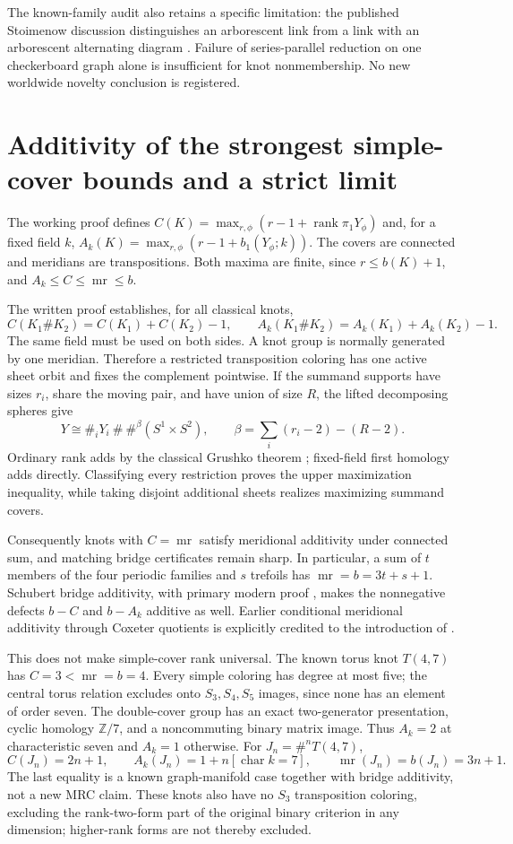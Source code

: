 \documentclass[11pt]{article}
\newcommand{\mr}{\operatorname{mr}}
\begin{document}
The known-family audit also retains a specific limitation:
the published Stoimenow discussion distinguishes an
arborescent link from a link with an arborescent alternating
diagram \cite[Proposition 6.3, Remark 6.4]{stoim}. Failure
of series-parallel reduction on one checkerboard graph
alone is insufficient for knot nonmembership. No new
worldwide novelty conclusion is registered.

\section{Additivity of the strongest simple-cover bounds and a strict limit}

The working proof 
defines $C(K)=\max_{r,\phi}(r-1+\operatorname{rank}\pi_1Y_\phi)$ and,
for a fixed field $k$, $A_k(K)=\max_{r,\phi}(r-1+b_1(Y_\phi;k))$.
The covers are connected and meridians are transpositions.
Both maxima are finite, since $r\le b(K)+1$, and
$A_k\le C\le\mr\le b$.

The written proof establishes, for all classical knots,
\[
 C(K_1\#K_2)=C(K_1)+C(K_2)-1,\qquad
 A_k(K_1\#K_2)=A_k(K_1)+A_k(K_2)-1.
\]
The same field must be used on both sides. A knot group is
normally generated by one meridian. Therefore a restricted
transposition coloring has one active sheet orbit and fixes
the complement pointwise. If the summand supports have sizes
$r_i$, share the moving pair, and have union of size $R$,
the lifted decomposing spheres give
\[
 Y\cong\#_iY_i\ \#\ \#^{\beta}(S^1\times S^2),\qquad
 \beta=\sum_i(r_i-2)-(R-2).
\]
Ordinary rank adds by the classical Grushko theorem
\cite[Theorem 1.B.5]{stallings}; fixed-field first homology
adds directly. Classifying every restriction proves the
upper maximization inequality, while taking disjoint
additional sheets realizes maximizing summand covers.

Consequently knots with $C=\mr$ satisfy meridional additivity
under connected sum, and matching bridge certificates remain
sharp. In particular, a sum of $t$ members of the four
periodic families and $s$ trefoils has $\mr=b=3t+s+1$.
Schubert bridge additivity, with primary modern proof
\cite[Theorem 1]{schultens}, makes the nonnegative defects
$b-C$ and $b-A_k$ additive as well. Earlier conditional
meridional additivity through Coxeter quotients is explicitly
credited to the introduction of \cite{bbk}.

This does not make simple-cover rank universal. The known
torus knot $T(4,7)$ has $C=3<\mr=b=4$. Every simple coloring
has degree at most five; the central torus relation excludes
onto $S_3,S_4,S_5$ images, since none has an element of order
seven. The double-cover group has an exact two-generator
presentation, cyclic homology $\mathbb Z/7$, and a noncommuting
binary matrix image. Thus $A_k=2$ at characteristic seven
and $A_k=1$ otherwise. For $J_n=\#^nT(4,7)$,
\[
 C(J_n)=2n+1,\qquad
 A_k(J_n)=1+n[\operatorname{char}k=7],\qquad
 \mr(J_n)=b(J_n)=3n+1.
\]
The last equality is a known graph-manifold case \cite{bdjw}
together with bridge additivity, not a new MRC claim. These
knots also have no $S_3$ transposition coloring, excluding
the rank-two-form part of the original binary criterion in
any dimension; higher-rank forms are not thereby excluded.
\end{document}

